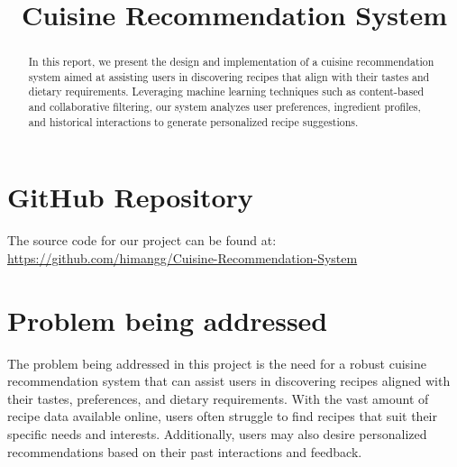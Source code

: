 \documentclass[conference]{IEEEtran}
\newcommand{\githublink}{\url{https://github.com/himangg/Cuisine-Recommendation-System}}
\begin{document}
\title{Cuisine Recommendation System}

\author{
\and
{}
}

\maketitle

\begin{abstract}
 In this report, we present the design and implementation of a cuisine recommendation system aimed at assisting users in discovering recipes that align with their tastes and dietary requirements. Leveraging machine learning techniques such as content-based and collaborative filtering, our system analyzes user preferences, ingredient profiles, and historical interactions to generate personalized recipe suggestions.
\end{abstract}

\section{GitHub Repository}
The source code for our project can be found at: \githublink

\section{Problem being addressed}
The problem being addressed in this project is the need for a robust cuisine recommendation system that can assist users in discovering recipes aligned with their tastes, preferences, and dietary requirements. With the vast amount of recipe data available online, users often struggle to find recipes that suit their specific needs and interests. Additionally, users may also desire personalized recommendations based on their past interactions and feedback.
\end{document}
